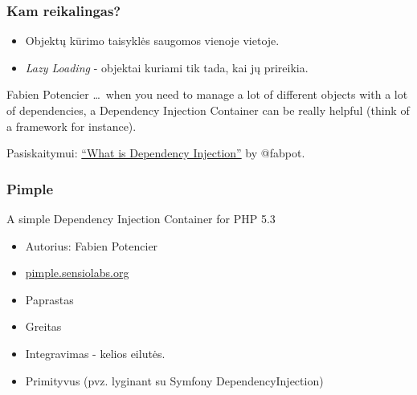 \documentclass[12pt,a4paper]{beamer}
\begin{document}
\begin{frame}
    \frametitle{Kam reikalingas?}

    \begin{itemize}
        \item Objektų kūrimo taisyklės saugomos vienoje vietoje.
        \item \textit{Lazy Loading} - objektai kuriami tik tada, kai jų prireikia.
    \end{itemize}

    \begin{block}{Fabien Potencier}
        \dots\ when you need to manage a lot of different objects with a lot of dependencies, a Dependency Injection Container can be really helpful (think of a framework for instance).
    \end{block}

    Pasiskaitymui: \href{http://fabien.potencier.org/article/11/what-is-dependency-injection}{``What is Dependency Injection''} by @fabpot.
    
\end{frame}
\begin{frame}
    \frametitle{Pimple}
    A simple Dependency Injection Container for PHP 5.3
    \begin{itemize}
        \item Autorius: Fabien Potencier
        \item \url{pimple.sensiolabs.org}
        \item Paprastas
        \item Greitas
        \item Integravimas - kelios eilutės.
        \item Primityvus (pvz. lyginant su Symfony DependencyInjection)
    \end{itemize}
\end{frame}
\end{document}
